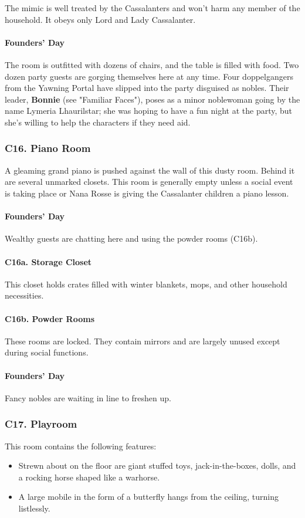 \documentclass[10pt,a4paper,twoside,twocolumn,openany,nodeprecatedcode]{dndbook}
\begin{document}
The mimic is well treated by the Cassalanters and won't harm any member of the household. It obeys only Lord and Lady Cassalanter.
\paragraph{Founders' Day}
The room is outfitted with dozens of chairs, and the table is filled with food. Two dozen party guests are gorging themselves here at any time. Four doppelgangers from the Yawning Portal have slipped into the party disguised as nobles. Their leader, \textbf{Bonnie} (see "Familiar Faces"), poses as a minor noblewoman going by the name Lymeria Lhaurilstar; she was hoping to have a fun night at the party, but she's willing to help the characters if they need aid.
\subsubsection{C16. Piano Room}
A gleaming grand piano is pushed against the wall of this dusty room. Behind it are several unmarked closets.
This room is generally empty unless a social event is taking place or Nana Rosse is giving the Cassalanter children a piano lesson.
\paragraph{Founders' Day}
Wealthy guests are chatting here and using the powder rooms (C16b).
\paragraph{C16a. Storage Closet}
This closet holds crates filled with winter blankets, mops, and other household necessities.
\paragraph{C16b. Powder Rooms}
These rooms are locked. They contain mirrors and are largely unused except during social functions.
\paragraph{Founders' Day}
Fancy nobles are waiting in line to freshen up.
\subsubsection{C17. Playroom}
This room contains the following features:
\begin{itemize}

\item Strewn about on the floor are giant stuffed toys, jack-in-the-boxes, dolls, and a rocking horse shaped like a warhorse.
\item A large mobile in the form of a butterfly hangs from the ceiling, turning listlessly.
\end{itemize}
\end{document}
